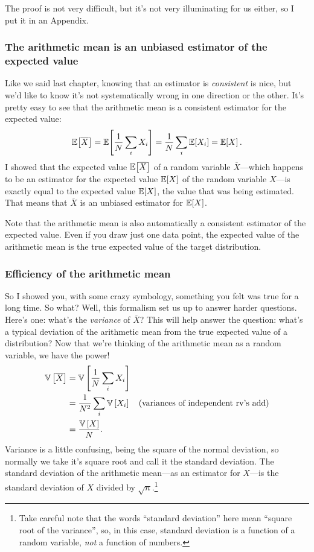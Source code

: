 The proof is not very difficult, but it's not very illuminating for us either,
so I put it in an Appendix.

\subsubsection{The arithmetic mean is an unbiased estimator of the expected value}

Like we said last chapter, knowing that an estimator is \emph{consistent} is nice,
but we'd like to know it's not systematically wrong in one direction or the other.
It's pretty easy to see that the arithmetic mean is a consistent estimator for the
expected value:
\begin{equation}
\mathbb{E}\!\left[{\overline{X}}\right] = \mathbb{E}\!\left[{\frac{1}{N} \sum_i X_i}\right] = \frac{1}{N} \sum_i \mathbb{E}\!\left[{X_i}\right] = \mathbb{E}\!\left[{X}\right].
\end{equation}
I showed that the expected value $\mathbb{E}\!\left[{\overline{X}}\right]$ of a random variable
$\overline{X}$---which happens to be an estimator for the expected value
$\mathbb{E}\!\left[{X}\right]$ of the random variable $X$---is exactly equal to the expected
value $\mathbb{E}\!\left[{X}\right]$, the value that was being estimated. That means that $\overline{X}$
is an unbiased estimator for $\mathbb{E}\!\left[{X}\right]$.

Note that the arithmetic mean is also automatically a consistent estimator of
the expected value. Even if you draw just one data point, the expected value
of the arithmetic mean is the true expected value of the target distribution.

\subsubsection{Efficiency of the arithmetic mean}

So I showed you, with some crazy symbology, something you felt was true for a
long time. So what? Well, this formalism set us up to answer harder questions.
Here's one: what's the \emph{variance} of $\overline{X}$? This will help
answer the question: what's a typical deviation of the arithmetic mean from
the true expected value of a distribution? Now that we're thinking of the
arithmetic mean as a random variable, we have the power!
\begin{align}\label{eq:sem}
\mathbb{V}\left[{\overline{X}}\right] &= \mathbb{V}\left[{\frac{1}{N} \sum_i X_i}\right] \nonumber\\
  &= \frac{1}{N^2} \sum_i \mathbb{V}\left[{X_i}\right] \quad\text{(variances of independent rv's add)} \nonumber\\
  &= \frac{\mathbb{V}\left[{X}\right]}{N}.
\end{align}
Variance is a little confusing, being the square of the normal deviation, so
normally we take it's square root and call it the standard deviation. The
standard deviation of the arithmetic mean---as an estimator for $X$---is the
standard deviation of $X$ divided by $\sqrt{n}$.\footnote{Take careful note
that the words ``standard deviation'' here mean ``square root of the variance'',
so, in this case, standard deviation is a function of a random variable, \emph{not}
a function of numbers.}

